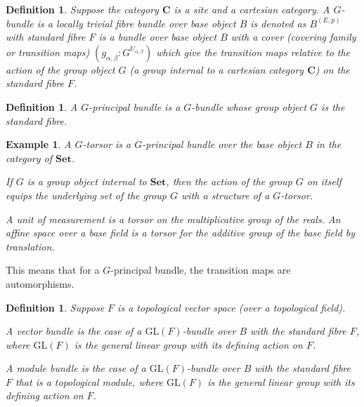 \documentclass{tufte-book}
\newtheorem{definition}[theorem]{Definition}
\newtheorem{example}[theorem]{Example}
\begin{document}
\begin{definition}
	Suppose the category $\mathbf{C}$ is a site and a cartesian category.
	A $G$-bundle is a locally trivial fibre bundle over base object $B$ is denoted as $B^{(E, p)}$ with standard fibre $F$ is a bundle over base object $B$ with a cover (covering family or transition maps) $(g_{\alpha, \beta} : G^{U_{\alpha, \beta}})$ which give the transition maps relative to the action of the group object $G$ (a group internal to a cartesian category $\mathbf{C}$) on the standard fibre $F$.
\end{definition}

\begin{definition}
	A $G$-principal bundle is a $G$-bundle whose group object $G$ is the standard fibre.
\end{definition}

\begin{example}
	A $G$-torsor is a $G$-principal bundle over the base object $B$ in the category of $\mathbf{Set}$.

	If $G$ is a group object internal to $\mathbf{Set}$, then the action of the group $G$ on itself equips the underlying set of the group $G$ with a structure of a $G$-torsor.

	A unit of measurement is a torsor on the multiplicative group of the reals. An affine space over a base field is a torsor for the additive group of the base field by translation.
\end{example}

This means that for a $G$-principal bundle, the transition maps are automorphisms.

\begin{definition}
	Suppose $F$ is a topological vector space (over a topological field).
	
	A vector bundle is the case of a $\mathrm{GL}(F)$-bundle over $B$ with the standard fibre $F$, where $\mathrm{GL}(F)$ is the general linear group with its defining action on $F$.

	A module bundle is the case of a $\mathrm{GL}(F)$-bundle over $B$ with the standard fibre $F$ that is a topological module, where $\mathrm{GL}(F)$ is the general linear group with its defining action on $F$.
\end{definition}
\end{document}
